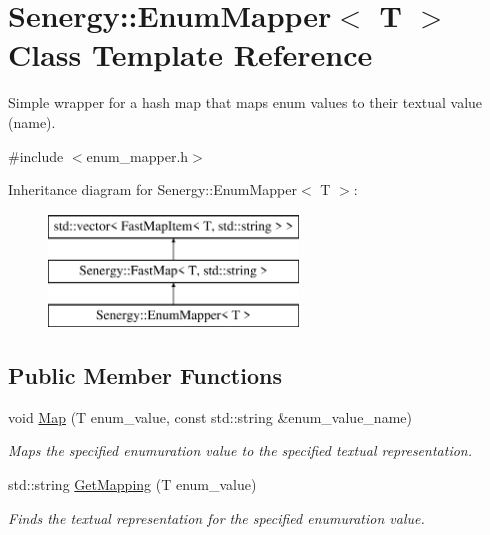 \hypertarget{class_senergy_1_1_enum_mapper}{\section{Senergy\-:\-:Enum\-Mapper$<$ T $>$ Class Template Reference}
\label{class_senergy_1_1_enum_mapper}
}


Simple wrapper for a hash map that maps enum values to their textual value (name).  




{\ttfamily \#include $<$enum\-\_\-mapper.\-h$>$}

Inheritance diagram for Senergy\-:\-:Enum\-Mapper$<$ T $>$\-:\begin{figure}[H]
\begin{center}
\leavevmode
\includegraphics[height=3.000000cm]{class_senergy_1_1_enum_mapper}
\end{center}
\end{figure}
\subsection*{Public Member Functions}
\begin{DoxyCompactItemize}
\item 
void \hyperlink{class_senergy_1_1_enum_mapper_a1bded4a48eb23c33dca633c7c59aba7e}{Map} (T enum\-\_\-value, const std\-::string \&enum\-\_\-value\-\_\-name)
\begin{DoxyCompactList}\small\item\em Maps the specified enumuration value to the specified textual representation. \end{DoxyCompactList}\item 
std\-::string \hyperlink{class_senergy_1_1_enum_mapper_a54d34e6d45397b9ec4d5d19ec5234b2c}{Get\-Mapping} (T enum\-\_\-value)
\begin{DoxyCompactList}\small\item\em Finds the textual representation for the specified enumuration value. \end{DoxyCompactList}\end{DoxyCompactItemize}


